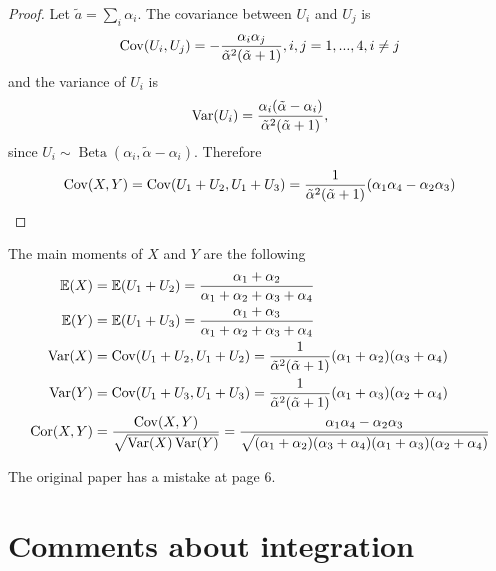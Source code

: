 \begin{proof}

  Let $\tilde{a} = \sum_i \alpha_i$. The covariance between $U_i$ and $U_j$ is \cite[]{lin2016dirichlet} 
\begin{equation}
  \operatorname{Cov}(U_i, U_j) = - \frac{\alpha_i\alpha_j}{\tilde{\alpha}^2(\tilde{\alpha}+1)}, i,j = 1,...,4, i \neq j
\end{equation} 
and the variance of $U_i$ is 
\begin{equation}
  \operatorname{Var}(U_i) = \frac{\alpha_i(\tilde{\alpha}-\alpha_i)}{\tilde{\alpha}^2(\tilde{\alpha}+1)},
\end{equation}
since $U_i \sim \operatorname{Beta}(\alpha_i, \tilde{\alpha} -\alpha_i)$.
Therefore 
\begin{equation}
  \operatorname{Cov}(X,Y) = \operatorname{Cov}(U_1+U_2, U_1+U_3) = \frac{1}{\tilde{\alpha}^2(\tilde{\alpha}+1)}(\alpha_1\alpha_4 - \alpha_2\alpha_3)
\end{equation}
  
\end{proof}

The main moments of $X$ and $Y$ are the following 
\begin{align*}
    \mathbb{E}(X) &= \mathbb{E}(U_1 + U_2) = \frac{\alpha_1+\alpha_2}{\alpha_1+\alpha_2+\alpha_3+\alpha_4} \\
    \mathbb{E}(Y) &= \mathbb{E}(U_1 + U_3) = \frac{\alpha_1+\alpha_3}{\alpha_1+\alpha_2+\alpha_3+\alpha_4} \\
    \operatorname{Var}(X) &= \operatorname{Cov}(U_1+U_2, U_1+U_2) = \frac{1}{\tilde{\alpha}^2(\tilde{\alpha}+1)}(\alpha_1+\alpha_2)(\alpha_3 + \alpha_4) \\
    \operatorname{Var}(Y) &= \operatorname{Cov}(U_1+U_3, U_1+U_3) = \frac{1}{\tilde{\alpha}^2(\tilde{\alpha}+1)}(\alpha_1+\alpha_3)(\alpha_2 + \alpha_4)  \\  
    \operatorname{Cor}(X,Y) &= \frac{\operatorname{Cov}(X,Y)}{\sqrt{\operatorname{Var}(X)\operatorname{Var}(Y)}} = \frac{\alpha_1\alpha_4 - \alpha_2\alpha_3}{\sqrt{(\alpha_1+\alpha_2)(\alpha_3+\alpha_4)(\alpha_1+\alpha_3)(\alpha_2+\alpha_4)}}
\end{align*}

\begin{remark}
    The original paper has a mistake at page 6. 
\end{remark}

\section{Comments about integration}

